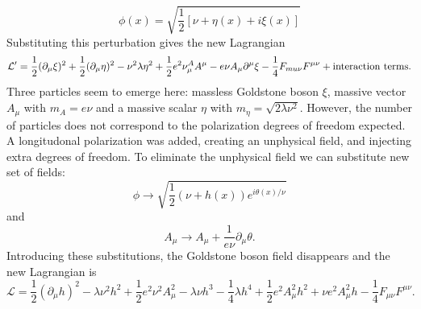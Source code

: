 \begin{equation}
\phi(x) =\sqrt{\frac{1}{2}[\nu+\eta(x)+i\xi(x)]}
\end{equation}
Substituting this perturbation gives the new Lagrangian
\begin{equation}
\mathcal{L}'=\frac{1}{2}(\partial_\mu\xi)^2+\frac{1}{2}(\partial_\mu\eta)^2-\nu^2\lambda\eta^2+\frac{1}{2}e^2\nu^A_\mu A^\mu-e\nu A_\mu \partial^\mu\xi-\frac{1}{4}F_{mu\nu}F^{\mu\nu} + \textnormal{interaction terms}.
\end{equation}
Three particles seem to emerge here: massless Goldstone boson $\xi$, massive vector $A_\mu$ with $m_A=e\nu$ and a massive scalar $\eta$ with $m_\eta=\sqrt{2\lambda\nu^2}$. However, the number of particles does not correspond to the polarization degrees of freedom expected. A longitudonal polarization was added, creating an unphysical field, and injecting extra degrees of freedom. To eliminate the unphysical field we can substitute new set of fields:
\begin{equation}
\phi \rightarrow \sqrt{\frac{1}{2}(\nu+h(x))e^{i\theta(x)/\nu}}
\end{equation}
and 
\begin{equation}
A_\mu \rightarrow A_\mu + \frac{1}{e\nu} \partial_\mu\theta.
\end{equation}
Introducing these substitutions, the Goldstone boson field disappears and the new Lagrangian is 
\begin{equation}
\mathcal{L} = \frac{1}{2}(\partial_\mu h)^2 -\lambda\nu^2h^2+\frac{1}{2}e^2\nu^2A_\mu^2-\lambda\nu h^3-\frac{1}{4}\lambda h^4+\frac{1}{2}e^2A_\mu^2h^2+\nu e^2A_\mu^2h-\frac{1}{4}F_{\mu\nu}F^{\mu\nu}.
\end{equation}
